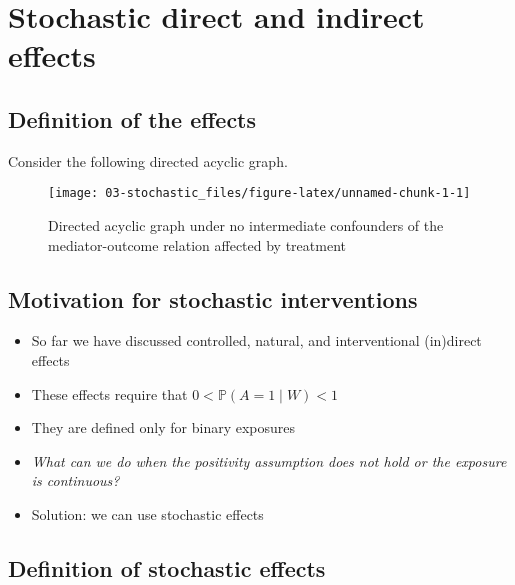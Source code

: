 \documentclass[
  12pt,
]{book}
\providecommand{\tightlist}{%
  \setlength{\itemsep}{0pt}\setlength{\parskip}{0pt}}
\theoremstyle{definition}
\theoremstyle{definition}
\theoremstyle{definition}
\renewcommand{\P}{\mathbb{P}}
\newcommand{\1}{\mathbbm{1}}
\begin{document}
\hypertarget{stochastic}{%
\chapter{Stochastic direct and indirect effects}\label{stochastic}}

\hypertarget{definition-of-the-effects}{%
\section{Definition of the effects}\label{definition-of-the-effects}}

Consider the following directed acyclic graph.

\begin{figure}

{\centering \texttt{[image: 03-stochastic\_files/figure-latex/unnamed-chunk-1-1]} 

}

\caption{Directed acyclic graph under no intermediate confounders of the mediator-outcome relation affected by treatment}\label{fig:unnamed-chunk-1}
\end{figure}

\hypertarget{motivation-for-stochastic-interventions}{%
\section{Motivation for stochastic interventions}\label{motivation-for-stochastic-interventions}}

\begin{itemize}
\tightlist
\item
  So far we have discussed controlled, natural, and interventional (in)direct effects
\item
  These effects require that \(0 < \P(A=1\mid W) < 1\)
\item
  They are defined only for binary exposures
\item
  \emph{What can we do when the positivity assumption does not hold or the exposure
  is continuous?}
\item
  Solution: we can use stochastic effects
\end{itemize}

\hypertarget{definition-of-stochastic-effects}{%
\section{Definition of stochastic effects}\label{definition-of-stochastic-effects}}
\end{document}
